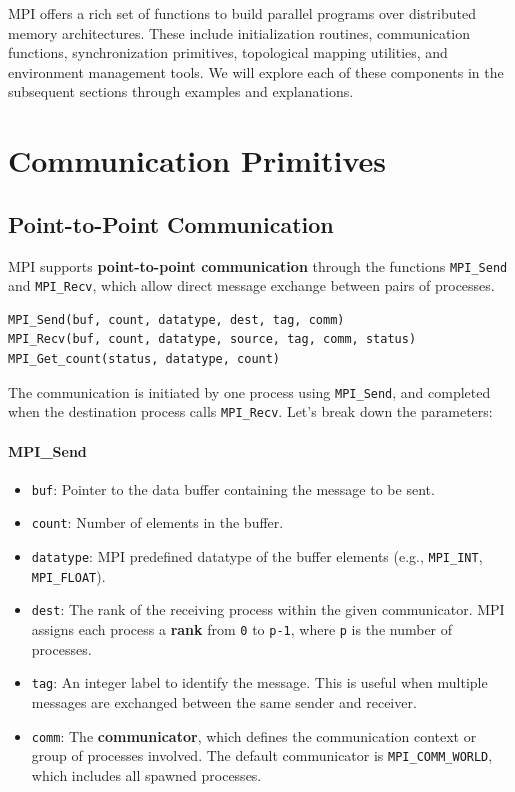 \documentclass[12pt]{book}
\begin{document}
MPI offers a rich set of functions to build parallel programs over distributed memory architectures. These include initialization routines, communication functions, synchronization primitives, topological mapping utilities, and environment management tools. We will explore each of these components in the subsequent sections through examples and explanations.


\section{Communication Primitives}
\subsection{Point-to-Point Communication}

MPI supports \textbf{point-to-point communication} through the functions \texttt{MPI\_Send} and \texttt{MPI\_Recv}, which allow direct message exchange between pairs of processes.

\begin{lstlisting}[style=cppstyle]
MPI_Send(buf, count, datatype, dest, tag, comm)
MPI_Recv(buf, count, datatype, source, tag, comm, status)
MPI_Get_count(status, datatype, count)
\end{lstlisting}

The communication is initiated by one process using \texttt{MPI\_Send}, and completed when the destination process calls \texttt{MPI\_Recv}. Let's break down the parameters:

\paragraph{MPI\_Send}
\begin{itemize}
    \item \texttt{buf}: Pointer to the data buffer containing the message to be sent.
    \item \texttt{count}: Number of elements in the buffer.
    \item \texttt{datatype}: MPI predefined datatype of the buffer elements (e.g., \texttt{MPI\_INT}, \texttt{MPI\_FLOAT}).
    \item \texttt{dest}: The rank of the receiving process within the given communicator. MPI assigns each process a \textbf{rank} from \texttt{0} to \texttt{p-1}, where \texttt{p} is the number of processes.
    \item \texttt{tag}: An integer label to identify the message. This is useful when multiple messages are exchanged between the same sender and receiver.
    \item \texttt{comm}: The \textbf{communicator}, which defines the communication context or group of processes involved. The default communicator is \texttt{MPI\_COMM\_WORLD}, which includes all spawned processes.
\end{itemize}
\end{document}
